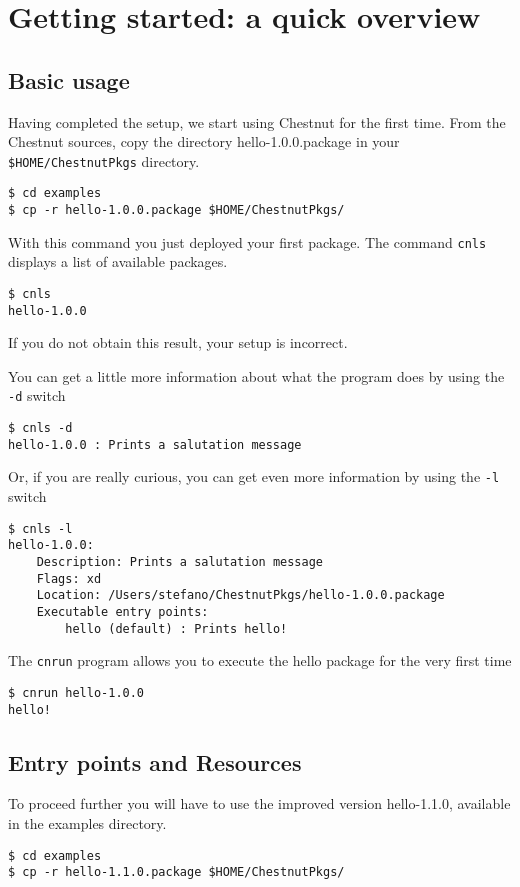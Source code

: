 \section{Getting started: a quick overview}

\subsection{Basic usage}

Having completed the setup, we start using Chestnut for the first time. From the Chestnut sources,
copy the directory hello-1.0.0.package in your \verb+$HOME/ChestnutPkgs+ directory.

\begin{verbatim}
$ cd examples
$ cp -r hello-1.0.0.package $HOME/ChestnutPkgs/ 
\end{verbatim}
With this command you just deployed your first package. 
The command \verb+cnls+ displays a list of available packages.
\begin{verbatim}
$ cnls
hello-1.0.0
\end{verbatim}
If you do not obtain this result, your setup is incorrect.

You can get a little more information about what the program does by using the
\verb+-d+ switch
\begin{verbatim}
$ cnls -d
hello-1.0.0 : Prints a salutation message
\end{verbatim}
Or, if you are really curious, you can get even more information by using the \verb+-l+ switch
\begin{verbatim}
$ cnls -l
hello-1.0.0:
    Description: Prints a salutation message
    Flags: xd
    Location: /Users/stefano/ChestnutPkgs/hello-1.0.0.package
    Executable entry points:
        hello (default) : Prints hello!
\end{verbatim}

The \verb+cnrun+ program allows you to execute the hello package for the very first time
\begin{verbatim}
$ cnrun hello-1.0.0
hello!
\end{verbatim}

\subsection{Entry points and Resources}

To proceed further you will have to use the improved version hello-1.1.0, available in the examples directory.
\begin{verbatim}
$ cd examples
$ cp -r hello-1.1.0.package $HOME/ChestnutPkgs/ 
\end{verbatim}


